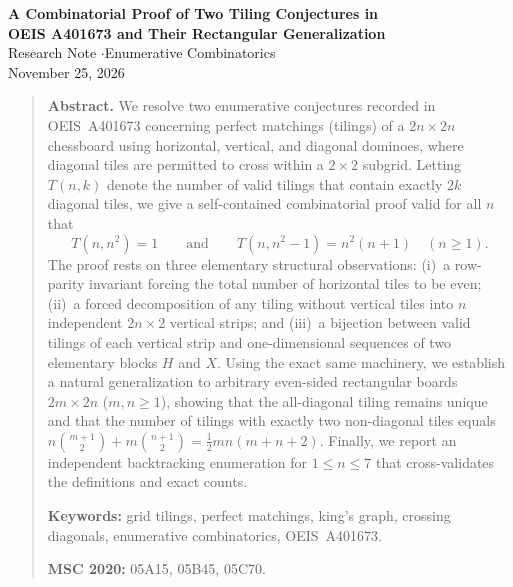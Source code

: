 \documentclass[11pt,a4paper]{article}
\theoremstyle{paperthm}
\theoremstyle{paperdef}
\begin{document}
\thispagestyle{plain}

\noindent{\color{navyblue}\rule{\linewidth}{1.6pt}}
\begin{center}
  \vspace{6pt}
  {\LARGE\bfseries\color{navyblue}
    A Combinatorial Proof of Two Tiling Conjectures in\\[3pt]
    OEIS A401673 and Their Rectangular Generalization}\\[10pt]
  {\normalsize\color{slate} Research Note \quad$\cdot$\quad Enumerative Combinatorics}\\[4pt]
  {\small\color{slate} November 25, 2026}
  \vspace{4pt}
\end{center}
\noindent{\color{rulegray}\rule{\linewidth}{0.7pt}}

\vspace{8pt}
\begin{quote}
  \small
  \noindent\textbf{\color{navyblue}Abstract.}
  We resolve two enumerative conjectures recorded in OEIS~A401673 concerning perfect matchings (tilings) of a $2n \times 2n$ chessboard using horizontal, vertical, and diagonal dominoes, where diagonal tiles are permitted to cross within a $2 \times 2$ subgrid. Letting $T(n,k)$ denote the number of valid tilings that contain exactly $2k$ diagonal tiles, we give a self-contained combinatorial proof valid for all $n$ that
  \[
    T(n, n^2) = 1 \qquad\text{and}\qquad T(n, n^2 - 1) = n^2(n+1) \quad (n \ge 1).
  \]
  The proof rests on three elementary structural observations: (i)~a row-parity invariant forcing the total number of horizontal tiles to be even; (ii)~a forced decomposition of any tiling without vertical tiles into $n$ independent $2n \times 2$ vertical strips; and (iii)~a bijection between valid tilings of each vertical strip and one-dimensional sequences of two elementary blocks $H$ and $X$. Using the exact same machinery, we establish a natural generalization to arbitrary even-sided rectangular boards $2m \times 2n$ ($m, n \ge 1$), showing that the all-diagonal tiling remains unique and that the number of tilings with exactly two non-diagonal tiles equals $n\binom{m+1}{2} + m\binom{n+1}{2} = \frac{1}{2}mn(m+n+2)$. Finally, we report an independent backtracking enumeration for $1 \le n \le 7$ that cross-validates the definitions and exact counts.

  \medskip
  \noindent\textbf{\color{navyblue}Keywords:}
  grid tilings, perfect matchings, king's graph, crossing diagonals, enumerative combinatorics, OEIS~A401673.

  \smallskip
  \noindent\textbf{\color{navyblue}MSC 2020:}
  05A15, 05B45, 05C70.
\end{quote}
\vspace{4pt}
\end{document}
